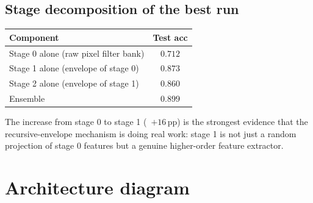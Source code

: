 \documentclass[11pt]{article}
\begin{document}
\subsection{Stage decomposition of the best run}

\begin{center}
\begin{tabular}{@{}lc@{}}
\toprule
Component & Test acc \\
\midrule
Stage 0 alone (raw pixel filter bank) & $0.712$ \\
Stage 1 alone (envelope of stage 0)   & $0.873$ \\
Stage 2 alone (envelope of stage 1)   & $0.860$ \\
Ensemble                               & $\mathbf{0.899}$ \\
\bottomrule
\end{tabular}
\end{center}

The increase from stage 0 to stage 1 (~$+16$\,pp) is the strongest
evidence that the recursive-envelope mechanism is doing real work:
stage 1 is not just a random projection of stage 0 features but a
genuine higher-order feature extractor.

\section{Architecture diagram}
\end{document}

